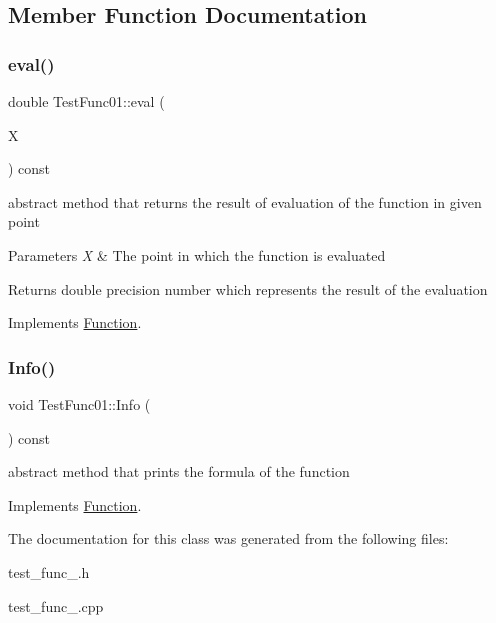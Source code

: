 \subsection{Member Function Documentation}
\mbox{\label{class_test_func01_a50b43b414345a790599ef55960a81cdb}} 
\subsubsection{\texorpdfstring{eval()}{eval()}}
{\footnotesize\ttfamily double Test\+Func01\+::eval (\begin{DoxyParamCaption}\item[{const \hyperlink{classv_point}{v\+Point} \&}]{X }\end{DoxyParamCaption}) const\hspace{0.3cm}{\ttfamily [virtual]}}

abstract method that returns the result of evaluation of the function in given point 
\begin{DoxyParams}{Parameters}
{\em X} & The point in which the function is evaluated \\
\hline
\end{DoxyParams}
\begin{DoxyReturn}{Returns}
double precision number which represents the result of the evaluation 
\end{DoxyReturn}


Implements \hyperlink{class_function_a8b9d55271a531b6f5bef09bfae0a23d9}{Function}.

\mbox{\label{class_test_func01_a731cfb0260fe58f6eab02f11449737e0}} 
\subsubsection{\texorpdfstring{Info()}{Info()}}
{\footnotesize\ttfamily void Test\+Func01\+::\+Info (\begin{DoxyParamCaption}{ }\end{DoxyParamCaption}) const\hspace{0.3cm}{\ttfamily [virtual]}}

abstract method that prints the formula of the function 

Implements \hyperlink{class_function_a6915be18a065224ed73b1288c6125948}{Function}.



The documentation for this class was generated from the following files\+:\begin{DoxyCompactItemize}
\item 
test\+\_\+func\+\_.\+h\item 
test\+\_\+func\+\_.\+cpp\end{DoxyCompactItemize}
